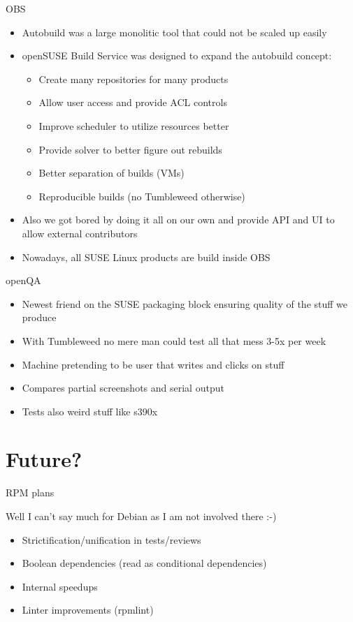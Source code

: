 \documentclass{beamer}
\begin{document}
\begin{frame}[t]{OBS}
	\begin{itemize}
	\item Autobuild was a large monolitic tool that could not be scaled up easily
	\item openSUSE Build Service was designed to expand the autobuild concept:
	\begin{itemize}
	\item Create many repositories for many products
	\item Allow user access and provide ACL controls
	\item Improve scheduler to utilize resources better
	\item Provide solver to better figure out rebuilds
	\item Better separation of builds (VMs)
	\item Reproducible builds (no Tumbleweed otherwise)
	\end{itemize}
	\item Also we got bored by doing it all on our own and provide API and UI to allow external contributors
	\item Nowadays, all SUSE Linux products are build inside OBS
	\end{itemize}
\end{frame}

\begin{frame}[t]{openQA}
	\begin{itemize}
	\item Newest friend on the SUSE packaging block ensuring quality of the stuff we produce
	\item With Tumbleweed no mere man could test all that mess 3-5x per week
	\item Machine pretending to be user that writes and clicks on stuff
	\item Compares partial screenshots and serial output
	\item Tests also weird stuff like s390x
	\end{itemize}
\end{frame}

\section{Future?}

\begin{frame}[t]{RPM plans}
    \begin{center}Well I can't say much for Debian as I am not involved there :-)\end{center}
	\begin{itemize}
	\item Strictification/unification in tests/reviews
	\item Boolean dependencies (read as conditional dependencies)
	\item Internal speedups
	\item Linter improvements (rpmlint)
	\end{itemize}
\end{frame}
\end{document}
